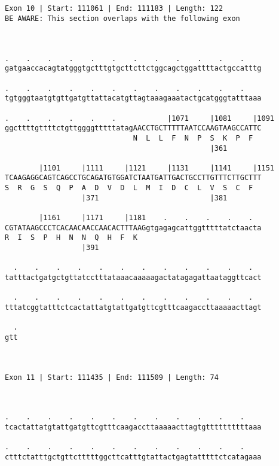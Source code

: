\documentclass{article}
\begin{document}
\begin{Verbatim}
                                                      
 
Exon 10 | Start: 111061 | End: 111183 | Length: 122
BE AWARE: This section overlaps with the following exon



.    .    .    .    .    .    .    .    .    .    .    .    
gatgaaccacagtatgggtgctttgtgcttcttctggcagctggattttactgccatttg
                                                            
.    .    .    .    .    .    .    .    .    .    .    .    
tgtgggtaatgtgttgatgttattacatgttagtaaagaaatactgcatgggtatttaaa
                                                            
.    .    .    .    .    .            |1071     |1081     |1091
ggcttttgttttctgttggggtttttatagAACCTGCTTTTTAATCCAAGTAAGCCATTC
                              N  L  L  F  N  P  S  K  P  F  
                                                |361        
  
        |1101     |1111     |1121     |1131     |1141     |1151
TCAAGAGGCAGTCAGCCTGCAGATGTGGATCTAATGATTGACTGCCTTGTTTCTTGCTTT
S  R  G  S  Q  P  A  D  V  D  L  M  I  D  C  L  V  S  C  F  
                  |371                          |381        
  
        |1161     |1171     |1181    .    .    .    .    .  
CGTATAAGCCCTCACAACAACCAACACTTTAAGgtgagagcattggtttttatctaacta
R  I  S  P  H  N  N  Q  H  F  K                             
                  |391                                      
  
  .    .    .    .    .    .    .    .    .    .    .    .  
tatttactgatgctgttatcctttataaacaaaaagactatagagattaataggttcact
                                                            
  .    .    .    .    .    .    .    .    .    .    .    .  
tttatcggtatttctcactattatgtattgatgttcgtttcaagaccttaaaaacttagt
                                                            
  .
gtt
   
   
 
Exon 11 | Start: 111435 | End: 111509 | Length: 74



.    .    .    .    .    .    .    .    .    .    .    .    
tcactattatgtattgatgttcgtttcaagaccttaaaaacttagtgttttttttttaaa
                                                            
.    .    .    .    .    .    .    .    .    .    .    .    
ctttctatttgctgttctttttggcttcatttgtattactgagtatttttctcatagaaa
                                                            

\end{Verbatim}
\end{document}

